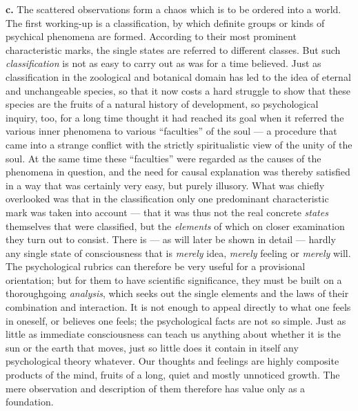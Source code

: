\documentclass[12pt,a4paper]{book}
\newcommand{\opage}[1]{\marginnote{\footnotesize\textit{[#1]}}}
\begin{document}
\textbf{c.} The scattered observations form a chaos which is to be
ordered into a world. The first working-up is a classification, by which
definite groups or kinds of psychical phenomena are formed. According to
their most prominent characteristic marks, the single states are
referred to different classes. But such \emph{classification} is not as
easy to carry out as was for a time believed. Just as classification in
the zoological and botanical domain has led to the idea of eternal and
unchangeable species, so that it now costs a hard struggle to show that
these species are the fruits of a natural history of development, so
psychological inquiry, too, for a long time thought it had reached its
goal when it referred the various inner phenomena to various
``faculties'' of the soul --- a procedure that came into a strange
conflict with the strictly spiritualistic view of the unity of the soul.
At the same time these ``faculties'' were regarded as the causes of the
phenomena in question, and the need for causal
\opage{23}explanation was thereby satisfied in a way that was certainly
very easy, but purely illusory. What was chiefly overlooked was that in
the classification only one predominant characteristic mark was taken
into account --- that it was thus not the real concrete \emph{states}
themselves that were classified, but the \emph{elements} of which on
closer examination they turn out to consist. There is --- as will later
be shown in detail --- hardly any single state of consciousness that is
\emph{merely} idea, \emph{merely} feeling or \emph{merely} will. The
psychological rubrics can therefore be very useful for a provisional
orientation; but for them to have scientific significance, they must be
built on a thoroughgoing \emph{analysis}, which seeks out the single
elements and the laws of their combination and interaction. It is not
enough to appeal directly to what one feels in oneself, or believes one
feels; the psychological facts are not so simple. Just as little as
immediate consciousness can teach us anything about whether it is the
sun or the earth that moves, just so little does it contain in itself
any psychological theory whatever. Our thoughts and feelings are highly
composite products of the mind, fruits of a long, quiet and mostly
unnoticed growth. The mere observation and description of them therefore
has value only as a foundation.
\end{document}
